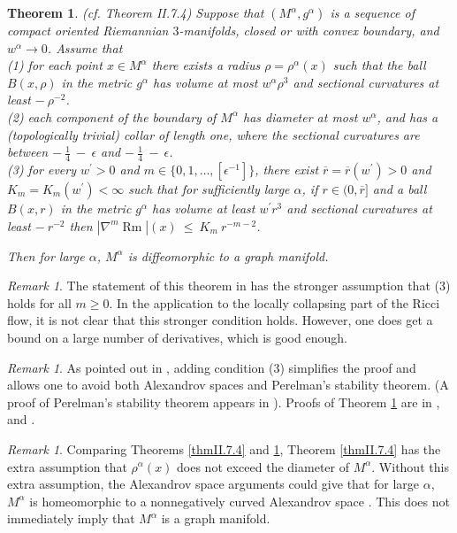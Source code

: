 \documentclass[12pt]{amsart}
\newcommand{\al}{\alpha}
\newcommand{\Rm}{\operatorname{Rm}}
\numberwithin{equation}{section}
\theoremstyle{plain}
\newtheorem{theorem}[equation]{Theorem}
\theoremstyle{definition}
\theoremstyle{remark}
\newtheorem{remark}[equation]{Remark}
\begin{document}
\begin{theorem} (cf. Theorem II.7.4) \label{thmII.7.4second}
Suppose that $(M^\al, g^\al)$ is a sequence of compact oriented Riemannian
$3$-manifolds, closed or with convex boundary, and $w^\al \rightarrow 0$.
Assume that \\
(1) for each point $x \in M^\al$ there exists a radius $\rho = \rho^\al(x)$
such that
the ball $B(x, \rho)$ in the metric $g^\al$ has volume at most
$w^\al \rho^3$ and sectional curvatures at least $- \: \rho^{-2}$.\\
(2) each component of the boundary of $M^\al$ has diameter at most
$w^\al$, and has a (topologically trivial) collar of length one, where
the sectional curvatures are between $- \: \frac14 \: - \: \epsilon$ and
$- \: \frac14 \: - \: \epsilon$. \\
(3) for every $w^\prime > 0$ and $m  \in \{0, 1, \ldots, [\epsilon^{-1}]\}$, 
there exist $\overline{r} = \overline{r}(w^\prime) > 0$
and $K_m = K_m(w^\prime) <\infty$ such that for sufficiently
large $\alpha$, if $r \in (0, \overline{r}]$
and a ball $B(x,r)$ in the metric $g^\al$
has volume at least $w^\prime r^3$ and sectional curvatures at least
$- \: r^{-2}$ then $|\nabla^m \Rm|(x) \: \le \: K_m \: r^{-m-2}$.

Then for large $\alpha$, $M^\al$ is diffeomorphic to a graph manifold.
\end{theorem}

\begin{remark}
The statement of this theorem in \cite[Theorem II.7.4]{Perelman2} has the 
stronger assumption that (3) holds for all $m \ge 0$. In the
application to the locally collapsing part of the Ricci flow,
it is not clear that this stronger condition holds.  However, one does get
a bound on a large number of derivatives, which is good enough.
\end{remark}

\begin{remark}
As pointed out in \cite[Section 7.4]{Perelman2}, adding condition (3) simplifies 
the proof
and allows one to avoid both Alexandrov spaces and Perelman's 
stability theorem. 
(A proof of Perelman's stability theorem appears in \cite{Kapovitch}).
Proofs of Theorem 
\ref{thmII.7.4second} are in \cite{Besson},
\cite{Kleiner-Lott} and \cite{Morgan-Tian2}.
\end{remark}

\begin{remark}
Comparing Theorems \ref{thmII.7.4} and \ref{thmII.7.4second}, 
Theorem \ref{thmII.7.4} has the extra assumption that 
$\rho^\al(x)$ does not exceed the diameter of $M^\al$.
Without this extra assumption, the Alexandrov space arguments could give
that for large $\al$, $M^\al$ is homeomorphic to a nonnegatively curved 
Alexandrov space \cite[Theorem 1.1(2)]{Shioya-Yamaguchi}. This does not
immediately imply that $M^\al$ is a graph manifold.
\end{remark}
\end{document}
